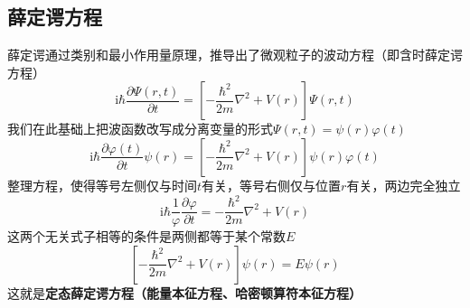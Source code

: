 \subsection{薛定谔方程}
薛定谔通过类别和最小作用量原理，推导出了微观粒子的波动方程（即含时薛定谔方程）
$$
    \mathrm{i}\hbar\frac{\partial \Psi(r, t)}{\partial t} = \left[-\frac{\hbar^2}{2m}\nabla^2 + V(r)\right]\Psi(r, t)
$$
我们在此基础上把波函数改写成分离变量的形式$\Psi(r,t)=\psi(r)\varphi(t)$
$$
    \mathrm{i}\hbar\frac{\partial \varphi(t)}{\partial t}\psi(r) = \left[-\frac{\hbar^2}{2m}\nabla^2 + V(r)\right]\psi(r)\varphi(t)
$$
整理方程，使得等号左侧仅与时间$t$有关，等号右侧仅与位置$r$有关，两边完全独立
$$
    \mathrm{i}\hbar\frac{1}{\varphi}\frac{\partial \varphi}{\partial t} = -\frac{\hbar^2}{2m}\nabla^2 + V(r)
$$
这两个无关式子相等的条件是两侧都等于某个常数$E$
$$
    \left[-\frac{\hbar^2}{2m}\nabla^2 + V(r)\right]\psi(r) = E\psi(r)
$$
这就是\textbf{定态薛定谔方程（能量本征方程、哈密顿算符本征方程）}


